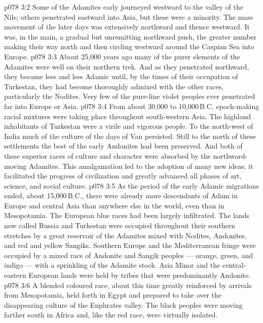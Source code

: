 \vs p078 3:2 Some of the Adamites early journeyed westward to the valley of the Nile; others penetrated eastward into Asia, but these were a minority. The mass movement of the later days was extensively northward and thence westward. It was, in the main, a gradual but unremitting northward push, the greater number making their way north and then circling westward around the Caspian Sea into Europe.
\vs p078 3:3 About 25,000 years ago many of the purer elements of the Adamites were well on their northern trek. And as they penetrated northward, they became less and less Adamic until, by the times of their occupation of Turkestan, they had become thoroughly admixed with the other races, particularly the Nodites. Very few of the pure\hyp{}line violet peoples ever penetrated far into Europe or Asia.
\vs p078 3:4 From about 30,000 to 10,000\,B.C. epoch\hyp{}making racial mixtures were taking place throughout south\hyp{}western Asia. The highland inhabitants of Turkestan were a virile and vigorous people. To the north\hyp{}west of India much of the culture of the days of Van persisted. Still to the north of these settlements the best of the early Andonites had been preserved. And both of these superior races of culture and character were absorbed by the northward\hyp{}moving Adamites. This amalgamation led to the adoption of many new ideas; it facilitated the progress of civilization and greatly advanced all phases of art, science, and social culture.
\vs p078 3:5 \pc As the period of the early Adamic migrations ended, about 15,000\,B.C., there were already more descendants of Adam in Europe and central Asia than anywhere else in the world, even than in Mesopotamia. The European blue races had been largely infiltrated. The lands now called Russia and Turkestan were occupied throughout their southern stretches by a great reservoir of the Adamites mixed with Nodites, Andonites, and red and yellow Sangiks. Southern Europe and the Mediterranean fringe were occupied by a mixed race of Andonite and Sangik peoples --- orange, green, and indigo --- with a sprinkling of the Adamite stock. Asia Minor and the central\hyp{}eastern European lands were held by tribes that were predominantly Andonite.
\vs p078 3:6 A blended coloured race, about this time greatly reinforced by arrivals from Mesopotamia, held forth in Egypt and prepared to take over the disappearing culture of the Euphrates valley. The black peoples were moving farther south in Africa and, like the red race, were virtually isolated.
